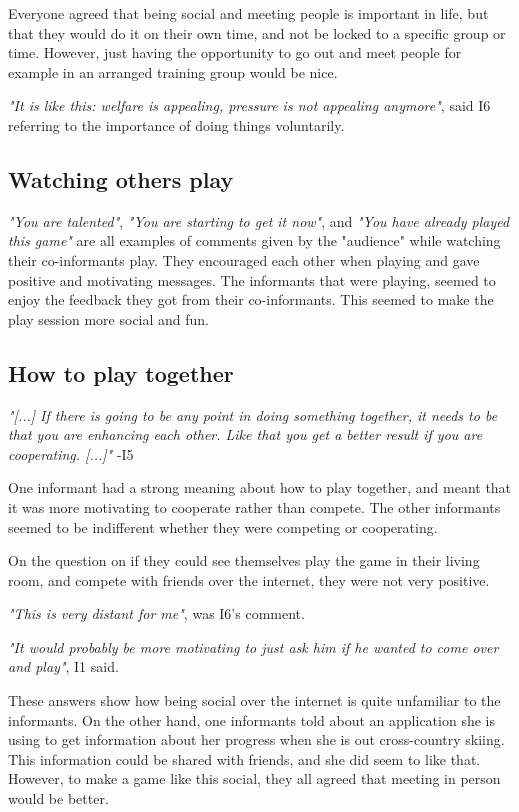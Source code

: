 Everyone agreed that being social and meeting people is important in life, but that they would do it on their own time, and not be locked to a specific group or time. However, just having the opportunity to go out and meet people for example in an arranged training group would be nice. 

\emph{"It is like this: welfare is appealing, pressure is not appealing anymore"}, said I6 referring to the importance of doing things voluntarily. 

\subsection{Watching others play}
\emph{"You are talented"}, \emph{"You are starting to get it now"}, and \emph{"You have already played this game"} are all examples of comments given by the "audience" while watching their co-informants play. They encouraged each other when playing and gave positive and motivating messages. The informants that were playing, seemed to enjoy the feedback they got from their co-informants. This seemed to make the play session more social and fun.  

\subsection{How to play together}
\emph{"[...] If there is going to be any point in doing something together, it needs to be that you are enhancing each other. Like that you get a better result if you are cooperating. [...]"} -I5

One informant had a strong meaning about how to play together, and meant that it was more motivating to cooperate rather than compete. The other informants seemed to be indifferent whether they were competing or cooperating.

On the question on if they could see themselves play the game in their living room, and compete with friends over the internet, they were not very positive.

\emph{"This is very distant for me"}, was I6's comment.

\emph{"It would probably be more motivating to just ask him if he wanted to come over and play"}, I1 said.

These answers show how being social over the internet is quite unfamiliar to the informants. On the other hand, one informants told about an application she is using to get information about her progress when she is out cross-country skiing. This information could be shared with friends, and she did seem to like that. However, to make a game like this social, they all agreed that meeting in person would be better.

